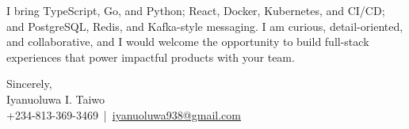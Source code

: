 \documentclass[a4paper, 12pt]{article}
\begin{document}
	I bring TypeScript, Go, and Python; React, Docker, Kubernetes, and CI/CD;
	and PostgreSQL, Redis, and Kafka-style messaging. I am curious, detail-oriented,
	and collaborative, and I would welcome the opportunity to build full-stack
	experiences that power impactful products with your team.

	\vspace{10pt}

	\noindent
	Sincerely,\\ Iyanuoluwa I. Taiwo\\ +234-813-369-3469 \,|\, \href{mailto:iyanuoluwa938@gmail.com}{iyanuoluwa938@gmail.com}
\end{document}

